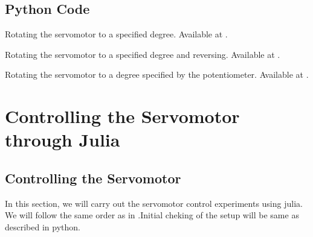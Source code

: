 \subsection{Python Code}
\lstset{style=mystyle}
\label{sec:servo-python-code}

\begin{pycode}
   {Rotating
    the servomotor to a specified degree.  Available at
    .}
  \label{py:servo-init}
  
\end{pycode}

\begin{pycode}
   {Rotating
    the servomotor to a specified degree and reversing.  Available at
    .}
  \label{py:servo-reverse}
  
\end{pycode}

\begin{pycode}
  \label{sci:servo-loop}
  
\end{pycode}

\begin{pycode}
   {Rotating the servomotor to a degree specified by
    the potentiometer.  Available at .}
  \label{py:servo-pot}
  
\end{pycode}

\section{Controlling the Servomotor through Julia}
\subsection{Controlling the Servomotor}
\label{sec:servo-julia}
In this section, we will carry out the servomotor control experiments
using julia.  We will follow the same order as in
.Initial cheking of the setup will be same as
described in python.

